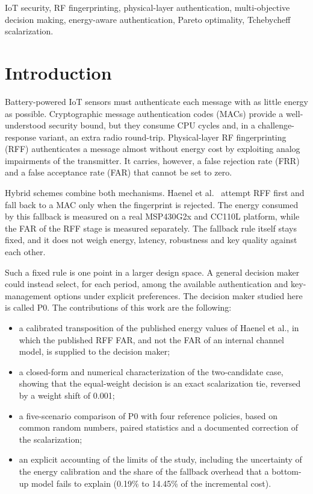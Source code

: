 \documentclass[conference]{IEEEtran}
\begin{document}
\begin{IEEEkeywords}
IoT security, RF fingerprinting, physical-layer authentication, multi-objective decision making, energy-aware authentication, Pareto optimality, Tchebycheff scalarization.
\end{IEEEkeywords}

\section{Introduction}

Battery-powered IoT sensors must authenticate each message with as little energy as possible. Cryptographic message authentication codes (MACs) provide a well-understood security bound, but they consume CPU cycles and, in a challenge-response variant, an extra radio round-trip. Physical-layer RF fingerprinting (RFF) authenticates a message almost without energy cost by exploiting analog impairments of the transmitter. It carries, however, a false rejection rate (FRR) and a false acceptance rate (FAR) that cannot be set to zero.

Hybrid schemes combine both mechanisms. Haenel et al.~\cite{haenel2021practical} attempt RFF first and fall back to a MAC only when the fingerprint is rejected. The energy consumed by this fallback is measured on a real MSP430G2x and CC110L platform, while the FAR of the RFF stage is measured separately. The fallback rule itself stays fixed, and it does not weigh energy, latency, robustness and key quality against each other.

Such a fixed rule is one point in a larger design space. A general decision maker could instead select, for each period, among the available authentication and key-management options under explicit preferences. The decision maker studied here is called P0. The contributions of this work are the following:
\begin{itemize}
  \item a calibrated transposition of the published energy values of Haenel et al., in which the published RFF FAR, and not the FAR of an internal channel model, is supplied to the decision maker;
  \item a closed-form and numerical characterization of the two-candidate case, showing that the equal-weight decision is an exact scalarization tie, reversed by a weight shift of 0.001;
  \item a five-scenario comparison of P0 with four reference policies, based on common random numbers, paired statistics and a documented correction of the scalarization;
  \item an explicit accounting of the limits of the study, including the uncertainty of the energy calibration and the share of the fallback overhead that a bottom-up model fails to explain (0.19\% to 14.45\% of the incremental cost).
\end{itemize}
\end{document}
